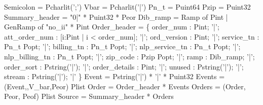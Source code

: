 \begin{code}\scriptsize
{} Semicolon = Pcharlit(';')
 Vbar = Pcharlit('|')
\mbox{}
 Pn\_t = Puint64
 Pzip = Puint32
\mbox{}
 Summary\_header = "0|" * Puint32 * Peor
\mbox{}
 Dib\_ramp = 
  Ramp of Pint 
| GenRamp of "no\_ii" * Pint
\mbox{}
 Order\_header = \{ 
    order\_num : Pint;  
'|'; att\_order\_num : [i:Pint | i < order\_num];  
'|'; ord\_version : Pint;  
'|'; service\_tn : Pn\_t Popt;
'|'; billing\_tn : Pn\_t Popt;  
'|'; nlp\_service\_tn : Pn\_t Popt;  
'|'; nlp\_billing\_tn : Pn\_t Popt;  
'|'; zip\_code : Pzip Popt;  
'|'; ramp : Dib\_ramp;  
'|'; order\_sort : Pstring('|');  
'|'; order\_details : Pint;
'|'; unused : Pstring('|');  
'|'; stream : Pstring('|'); 
'|'
\} 
\mbox{}
 Event  = Pstring('|') * '|' * Puint32
 Events = (Event,,V_bar,Peor) Plist
\mbox{}
 Order  = Order\_header * Events
 Orders = (Order, Peor, Peof) Plist
\mbox{}
 Source = Summary\_header * Orders\end{code}
